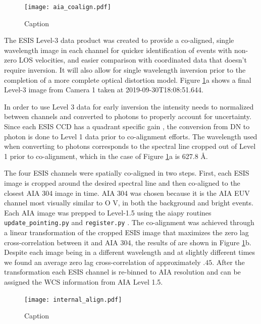     
   		\begin{figure}[htb!]
    		\centering
    		\texttt{[image: aia\_coalign.pdf]}
    		\caption{Caption}
    		\label{fig:coalign}
    	\end{figure}
    
    	\newcommand{\levthreetime}{2019-09-30T18:08:51.644}
    	The ESIS Level-3 data product was created to provide a co-aligned, single wavelength image in each channel for quicker identification of events with non-zero LOS velocities, and easier comparison with coordinated data that doesn't require inversion. 
    	It will also allow for single wavelength inversion prior to the completion of a more complete optical distortion model.
    	Figure \ref{fig:coalign}a shows a final Level-3 image from Camera 1 taken at \levthreetime.
    
     	In order to use Level 3 data for early inversion the intensity needs to normalized between channels and converted to photons to properly account for uncertainty.
   		Since each ESIS CCD has a quadrant specific gain \citep{ESIS}, the conversion from DN to photon is done to Level 1 data prior to co-alignment efforts.
   		The wavelength used when converting to photons corresponds to the spectral line cropped out of Level 1 prior to co-alignment, which in the case of Figure \ref{fig:coalign}a is 627.8 \AA.
   		
   		The four ESIS channels were spatially co-aligned in two steps.  
   		First, each ESIS image is cropped around the desired spectral line and then co-aligned to the closest AIA 304 image in time.  
   		AIA 304 was chosen because it is the AIA EUV channel most visually similar to O V, in both the background and bright events.
   		Each AIA image was prepped to Level-1.5 using the aiapy routines \texttt{update\_pointing.py} and \texttt{register.py} \citep{aiapy}.
   		The co-alignment was achieved through a linear transformation of the cropped ESIS image that maximizes the zero lag cross-correlation between it and AIA 304, the results of are shown in Figure \ref{fig:coalign}b.
   		Despite each image being in a different wavelength and at slightly different times we found an average zero lag cross-correlation of approximately $.45$.
   		After the transformation each ESIS channel is re-binned to AIA resolution and can be assigned the WCS information from AIA Level 1.5.

    	\begin{figure}[htb!]
    		\centering
    		\texttt{[image: internal\_align.pdf]}
			\caption{Caption}
    		\label{fig:cc}	
    	\end{figure}
    
